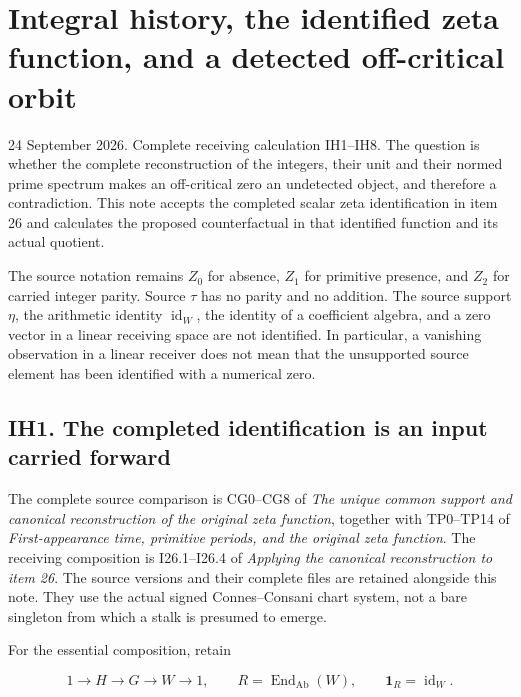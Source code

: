 \section{Integral history, the identified zeta function, and a detected
off-critical
orbit}\label{integral-history-the-identified-zeta-function-and-a-detected-off-critical-orbit}

24 September 2026. Complete receiving calculation IH1--IH8. The question
is whether the complete reconstruction of the integers, their unit and
their normed prime spectrum makes an off-critical zero an undetected
object, and therefore a contradiction. This note accepts the completed
scalar zeta identification in item 26 and calculates the proposed
counterfactual in that identified function and its actual quotient.

The source notation remains \(Z_0\) for absence, \(Z_1\) for primitive
presence, and \(Z_2\) for carried integer parity. Source \(\tau\) has no
parity and no addition. The source support \(\eta\), the arithmetic
identity \(\operatorname{id}_W\), the identity of a coefficient algebra,
and a zero vector in a linear receiving space are not identified. In
particular, a vanishing observation in a linear receiver does not mean
that the unsupported source element has been identified with a numerical
zero.

\subsection{IH1. The completed identification is an input carried
forward}\label{ih1.-the-completed-identification-is-an-input-carried-forward}

The complete source comparison is CG0--CG8 of \emph{The unique common
support and canonical reconstruction of the original zeta function},
together with TP0--TP14 of \emph{First-appearance time, primitive
periods, and the original zeta function}. The receiving composition is
I26.1--I26.4 of \emph{Applying the canonical reconstruction to item 26}.
The source versions and their complete files are retained alongside this
note. They use the actual signed Connes--Consani chart system, not a
bare singleton from which a stalk is presumed to emerge.

For the essential composition, retain

\[
1\longrightarrow H\longrightarrow G\longrightarrow W\longrightarrow1,
\qquad R=\operatorname{End}_{\mathrm{Ab}}(W),\qquad
\mathbf1_R=\operatorname{id}_W.
\tag{IH1.1}
\]

